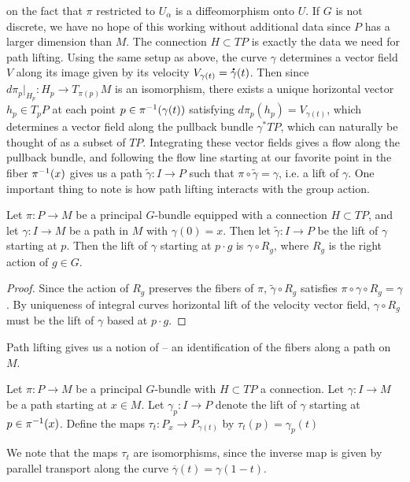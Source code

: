 on the fact that $\pi$ restricted to $U_\alpha$ is a diffeomorphism onto $U$.
If $G$ is not discrete, we have no hope of this working without additional data
since $P$ has a larger dimension than $M$. The connection $H \subset TP$ is
exactly the data we need for path lifting. Using the same setup as above,
the curve $\gamma$ determines a vector field $V$ along its image given by
its velocity $V_{\gamma(t)} = \accentset{\mbox{\large\bfseries .}}{\gamma}(t)$. Then since
$d\pi_p\vert_{H_p} : H_p \to T_{\pi(p)}M$ is an isomorphism, there exists
a unique horizontal vector $h_p \in T_pP$ at each point $p \in \pi^{-1}(\gamma(t))$
satisfying $d\pi_p(h_p) = V_{\gamma(t)}$, which determines a vector field along
the pullback bundle $\gamma^*TP$, which can naturally be thought of as a subset
of $TP$. Integrating these vector fields gives a flow along the pullback bundle,
and following the flow line starting at our favorite point in the fiber
$\pi^{-1}(x)$ gives us a path $\tilde{\gamma} : I \to P$ such that
$\pi \circ \tilde{\gamma} = \gamma$, i.e. a lift of $\gamma$. One important
thing to note is how path lifting interacts with the group action.
%
\begin{prop}
Let $\pi : P \to M$ be a principal $G$-bundle equipped with a connection
$H \subset TP$, and let $\gamma : I \to M$ be a path in $M$ with $\gamma(0) = x$.
Then let $\tilde{\gamma} : I \to P$ be the lift of $\gamma$ starting at $p$.
Then the lift of $\gamma$ starting at $p \cdot g$ is $\gamma \circ R_g$,
where $R_g$ is the right action of $g \in G$.
\end{prop}
%
\begin{proof}
Since the action of $R_g$ preserves the fibers of $\pi$,
$\tilde{\gamma} \circ R_g$ satisfies $\pi \circ \gamma \circ R_g = \gamma$.
By uniqueness of integral curves horizontal lift of the velocity vector field,
$\gamma \circ R_g$ must be the lift of $\gamma$ based at $p \cdot g$.
\end{proof}
%
Path lifting gives us a notion of  -- an identification of
the fibers along a path on $M$.
%
\begin{defn}
Let $\pi : P \to M$ be a principal $G$-bundle with $H \subset TP$ a connection.
Let $\gamma : I \to M$ be a path starting at $x \in M$. Let
$\gamma_p : I \to P$ denote the lift of $\gamma$ starting at $p \in \pi^{-1}(x)$.
Define the  maps $\tau_t : P_x \to P_{\gamma(t)}$ by
$\tau_t(p) = \gamma_p(t)$
\end{defn}
%
We note that the maps $\tau_t$ are isomorphisms, since the inverse map is given
by parallel transport along the curve $\overline{\gamma}(t) = \gamma(1-t)$.
